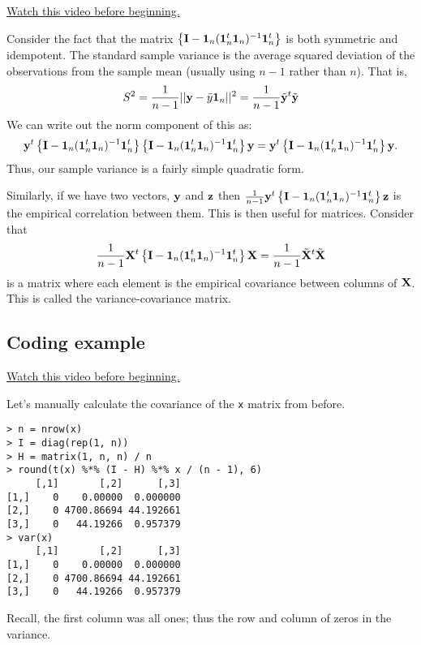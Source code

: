 \href{https://www.youtube.com/watch?v=hTVkDOojbdw&index=5&list=PLpl-gQkQivXhdgUCdaUQcdb31CRe8Mm2y}{Watch this video before beginning.}


Consider the fact that the matrix $\left\{ \mathbf{I} - \mathbf{1}_n (\mathbf{1}_n^t \mathbf{1}_n)^{-1} \mathbf{1}_n^t \right\}$
is both symmetric and idempotent. The standard sample variance is the average squared deviation of the
observations from the sample mean (usually using $n-1$ rather than $n$). That is,
$$
S^2 = \frac{1}{n-1}|| \mathbf{y} - \bar y \mathbf{1}_n ||^2 = \frac{1}{n-1} \tilde {\mathbf{y}}^t \tilde {\mathbf{y}}
$$
We can write out the norm component of this as: 
$$
\mathbf{y}^t \left\{ \mathbf{I} - \mathbf{1}_n (\mathbf{1}_n^t \mathbf{1}_n)^{-1} \mathbf{1}_n^t \right\}
\left\{ \mathbf{I} - \mathbf{1}_n (\mathbf{1}_n^t \mathbf{1}_n)^{-1} \mathbf{1}_n^t \right\} \mathbf{y}
= \mathbf{y}^t \left\{ \mathbf{I} - \mathbf{1}_n (\mathbf{1}_n^t \mathbf{1}_n)^{-1} \mathbf{1}_n^t \right\}\mathbf{y}.
$$
Thus, our sample variance is a fairly simple quadratic form. 

Similarly, if we have two vectors, $\mathbf{y}$ and $\mathbf{z}$ then $\frac{1}{n-1}\mathbf{y}^t \left\{ \mathbf{I} - \mathbf{1}_n (\mathbf{1}_n^t \mathbf{1}_n)^{-1} \mathbf{1}_n^t \right\} \mathbf{z}$ is the
empirical correlation between them.
This is then useful for matrices. Consider that
$$
\frac{1}{n-1} \mathbf{X}^t \left\{ \mathbf{I} - \mathbf{1}_n (\mathbf{1}_n^t \mathbf{1}_n)^{-1} \mathbf{1}_n^t \right\} \mathbf{X}
= \frac{1}{n-1} \tilde {\mathbf{X}}^t \tilde {\mathbf{X}}
$$
is a matrix where each element is the empirical covariance between columns of $\mathbf{X}$.
This is called the variance-covariance matrix. 

\subsection{Coding example}

\href{https://www.youtube.com/watch?v=_AHZIy8PRmU&list=PLpl-gQkQivXhdgUCdaUQcdb31CRe8Mm2y&index=6}{Watch this video before beginning.}

Let's manually calculate the covariance of the \texttt{x} matrix from before.

\begin{verbatim}
> n = nrow(x)
> I = diag(rep(1, n))
> H = matrix(1, n, n) / n
> round(t(x) %*% (I - H) %*% x / (n - 1), 6)
     [,1]       [,2]      [,3]
[1,]    0    0.00000  0.000000
[2,]    0 4700.86694 44.192661
[3,]    0   44.19266  0.957379
> var(x)
     [,1]       [,2]      [,3]
[1,]    0    0.00000  0.000000
[2,]    0 4700.86694 44.192661
[3,]    0   44.19266  0.957379
\end{verbatim}
Recall, the first column was all ones; thus the row and column of zeros in the variance.





